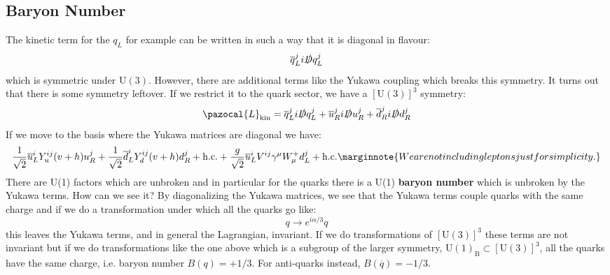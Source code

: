 \documentclass[../main.tex]{subfiles}
\begin{document}
\subsection{Baryon Number}
The kinetic term for the $q_L$ for example can be written in such a way that it is diagonal in flavour:
\[
\overline{q}_L^ji\slashed{D}q^j_L
\]
which is symmetric under $\text{U}(3)$. However, there are additional terms like the Yukawa coupling which breaks this symmetry. It turns out that there is some symmetry leftover. If we restrict it to the quark sector, we have a $[\text{U}(3)]^3$ symmetry:
\[
\pazocal{L}_{\text{kin}}=\overline{q}_L^ji\slashed{D}q_L^j+\overline{u}_R^ji\slashed{D}u_R^j+\overline{d}_R^ji\slashed{D}d_R^j
\]
If we move to the basis where the Yukawa matrices are diagonal we have:
\[
\frac{1}{\sqrt{2}}\overline{u}_L^iY_u^{ij}(v+h)u_R^j+\frac{1}{\sqrt{2}}\overline{d}_L^iY_d^{ij}(v+h)d_R^j+\text{h.c.}+\frac{g}{\sqrt{2}}\overline{u}_L^iV^{ij}\gamma^\mu W_\mu^+ d_L^j+\text{h.c.}\marginnote{We are not including leptons just for simplicity.}
\]
There are U(1) factors which are unbroken and in particular for the quarks there is a U(1) \textbf{baryon number} which is unbroken by the Yukawa terms. How can we see it? By diagonalizing the Yukawa matrices, we see that the Yukawa terms couple quarks with the same charge and if we do a transformation under which all the quarks go like:
\[
q\to e^{i\alpha/3}q
\]
this leaves the Yukawa terms, and in general the Lagrangian, invariant. If we do transformations of $[\text{U}(3)]^3$ these terms are not invariant but if we do transformations like the one above which is a subgroup of the larger symmetry,  U$(1)_{\text{B}}\subset[\text{U}(3)]^3$, all the quarks have the same charge, i.e. baryon number $B(q)=+1/3$. For anti-quarks instead, $B(\overline{q})=-1/3.$
\end{document}

